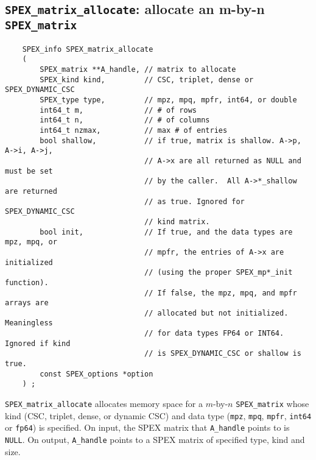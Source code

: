 \documentclass[12pt]{report}
\theoremstyle{definition}
\begin{document}
\subsection{\texttt{SPEX\_matrix\_allocate}: allocate an m-by-n \texttt{SPEX\_matrix}}
\label{s:user:matrix_allocate}

\begin{mdframed}[userdefinedwidth=6in]
{\footnotesize
\begin{verbatim}
    SPEX_info SPEX_matrix_allocate
    (
        SPEX_matrix **A_handle, // matrix to allocate
        SPEX_kind kind,         // CSC, triplet, dense or SPEX_DYNAMIC_CSC
        SPEX_type type,         // mpz, mpq, mpfr, int64, or double
        int64_t m,              // # of rows
        int64_t n,              // # of columns
        int64_t nzmax,          // max # of entries
        bool shallow,           // if true, matrix is shallow. A->p, A->i, A->j,
                                // A->x are all returned as NULL and must be set
                                // by the caller.  All A->*_shallow are returned
                                // as true. Ignored for SPEX_DYNAMIC_CSC
                                // kind matrix.
        bool init,              // If true, and the data types are mpz, mpq, or
                                // mpfr, the entries of A->x are initialized
                                // (using the proper SPEX_mp*_init function).
                                // If false, the mpz, mpq, and mpfr arrays are
                                // allocated but not initialized. Meaningless
                                // for data types FP64 or INT64. Ignored if kind
                                // is SPEX_DYNAMIC_CSC or shallow is true.
        const SPEX_options *option
    ) ;
\end{verbatim}
} \end{mdframed}

\verb|SPEX_matrix_allocate| allocates memory space for a $m$-by-$n$
\verb|SPEX_matrix| whose kind (CSC, triplet, dense, or dynamic CSC) and data type
(\verb|mpz|, \verb|mpq|, \verb|mpfr|, \verb|int64| or \verb|fp64|) is
specified. On input, the SPEX matrix that \verb|A_handle| points to is \verb|NULL|. 
On output, \verb|A_handle| points to a SPEX matrix of specified type, kind and size.
\end{document}
